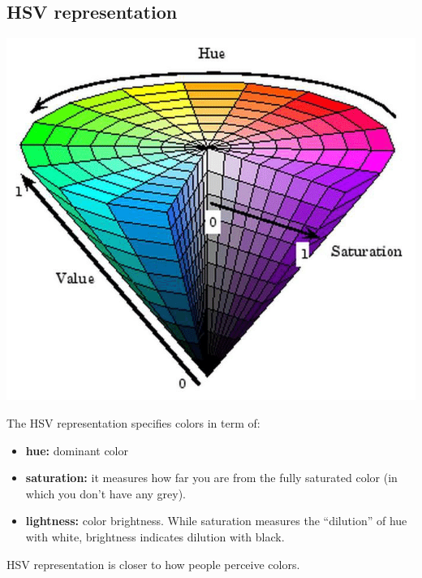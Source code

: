 \subsection{HSV representation}
\begin{center}
    \includegraphics[scale = 0.3]{images/HSV.png}
\end{center}
The HSV representation specifies colors in term of:
\begin{itemize}
    \item \textbf{hue:} dominant color
    \item \textbf{saturation:} it measures how far you are from the fully saturated color (in which you don't have any grey).
    \item \textbf{lightness:} color brightness. While saturation measures the “dilution” of hue with white, brightness indicates dilution with black.
\end{itemize}
HSV representation is closer to how people perceive colors.

